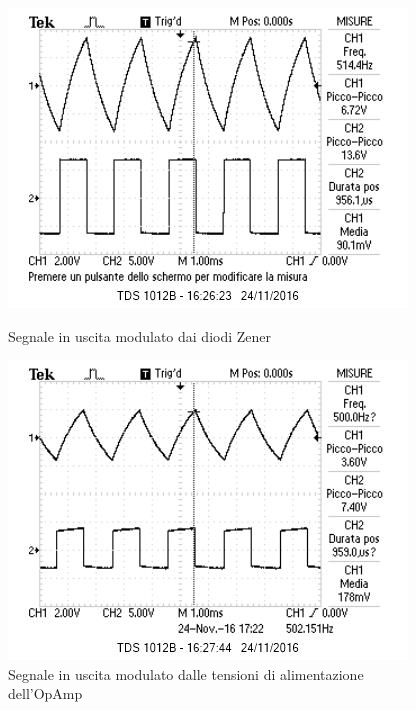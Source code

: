 \documentclass[10pt,a4paper]{article}
\begin{document}
{\begin{figure}[H]
    \centering
    \begin{minipage}{0.49\textwidth}
        \centering
        \includegraphics[width = \textwidth]{../oscilloscopio/fig1.jpg}
        \caption{Segnale in uscita modulato dai diodi Zener}
        \label{fig:fig1}
    \end{minipage}
    \begin{minipage}{0.49\textwidth}
        \centering
        \includegraphics[width = \textwidth]{../oscilloscopio/fig2.jpg}
        \caption{Segnale in uscita modulato dalle tensioni di alimentazione dell'OpAmp}
        \label{fig:fig2}
    \end{minipage}
\end{figure}

}
\end{document}
